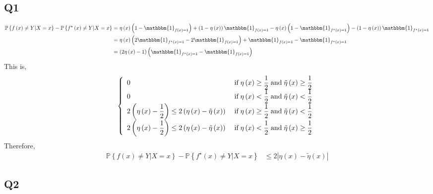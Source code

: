 \documentclass{article}
\begin{document}
\subsection{Q1}
\begin{align*}
\mathbb{P}\left\{f\left(x\right) \neq  Y | X = x\right\} - \mathbb{P}\left\{f^\star \left(x\right) \neq  Y | X = x\right\} &= \eta\left(x\right) \left(1 - \mathbbm{1}_{f\left(x\right) = 1}\right) + \left(1 - \eta\left(x\right)\right) \mathbbm{1}_{f\left(x\right) = 1} - \eta\left(x\right) \left(1 - \mathbbm{1}_{f^\star \left(x\right) = 1}\right) - \left(1 - \eta\left(x\right)\right) \mathbbm{1}_{f^\star \left(x\right) = 1}
\\ &= \eta\left(x\right) \left(2 \mathbbm{1}_{f^\star \left(x\right) = 1} - 2 \mathbbm{1}_{f\left(x\right) = 1}\right) + \mathbbm{1}_{f\left(x\right) = 1} - \mathbbm{1}_{f^\star \left(x\right) = 1}
\\ &= \left(2 \eta\left(x\right) - 1\right) \left(\mathbbm{1}_{f^\star \left(x\right) = 1} - \mathbbm{1}_{f\left(x\right) = 1}\right)
\end{align*}
This is,
\[ \left\{ \begin{array}{ll}
0& \text{\;if\;} \eta\left(x\right) \geq  \dfrac{1}{2} \text{\;and\;} \tilde{\eta}\left(x\right) \geq  \dfrac{1}{2} \\
0& \text{\;if\;} \eta\left(x\right) < \dfrac{1}{2} \text{\;and\;} \tilde{\eta}\left(x\right) < \dfrac{1}{2} \\
2 \left(\eta\left(x\right) - \dfrac{1}{2}\right) \leq  2 \left(\eta\left(x\right) - \tilde{\eta}\left(x\right)\right)& \text{\;if\;} \eta\left(x\right) \geq  \dfrac{1}{2} \text{\;and\;} \tilde{\eta}\left(x\right) < \dfrac{1}{2} \\
2 \left(\eta\left(x\right) - \dfrac{1}{2}\right) \leq  2 \left(\eta\left(x\right) - \tilde{\eta}\left(x\right)\right)& \text{\;if\;} \eta\left(x\right) < \dfrac{1}{2} \text{\;and\;} \tilde{\eta}\left(x\right) \geq  \dfrac{1}{2} \\
\end{array}\right. \]
Therefore,
\begin{align*}
\mathbb{P}\left\{f\left(x\right) \neq  Y | X = x\right\} - \mathbb{P}\left\{f^\star \left(x\right) \neq  Y | X = x\right\} &\leq  2 |\eta\left(x\right) - \tilde{\eta}\left(x\right)|
\end{align*}


\subsection{Q2}
\end{document}
